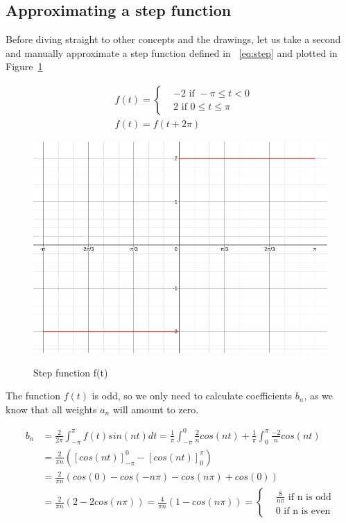 \documentclass[titlepage]{article}
\begin{document}
\subsection{Approximating a step function}
    
    Before diving straight to other concepts and the drawings, let us 
    take a second and manually approximate a step function defined in ~\eqref{eq:step}
    and plotted in Figure~\ref{fig:step_func}

    \begin{equation}\label{eq:step}
    \begin{split}
         &f(t) = 
        \begin{cases} 
            & -2 \text{ if } -\pi \leq t < 0 \\
            & 2 \text{ if }  0 \leq t \leq \pi
        \end{cases} \\
        & f(t) = f(t + 2\pi) 
    \end{split}
    \end{equation}

    \begin{figure}[H]
        \caption{Step function f(t)}
        \centering
        \includegraphics[width=0.5\linewidth]{step_func}
        \label{fig:step_func}
    \end{figure} 

    The function $f(t)$ is odd, so we only need to calculate coefficients $b_n$, as
    we know that all weights $a_n$ will amount to zero.

    \begin{equation}
    \begin{split}
        b_n & = \frac{2}{2\pi}\int_{-\pi}^{\pi}f(t)sin(nt)dt 
        = \frac{1}{\pi}\int_{-\pi}^{0}\frac{2}{n}cos(nt) + 
        \frac{1}{\pi}\int_{0}^{\pi}\frac{-2}{n}cos(nt) \\
        & = \frac{2}{\pi n}\left(\left[cos(nt) \right]_{-\pi}^{0}
        - \left[cos(nt) \right]_{0}^{\pi} \right) \\
        & = \frac{2}{\pi n}\left(cos(0) - cos(-n\pi) - cos(n\pi) + cos(0)\right) \\
        & = \frac{2}{\pi n}\left(2 - 2cos(n\pi)\right) 
        = \frac{4}{\pi n}\left(1 - cos(n\pi)\right) = 
        \begin{cases} 
            & \frac{8}{n\pi} \text{ if n is odd} \\
            & 0 \text{ if n is even}
        \end{cases} 
    \end{split}
    \end{equation}
    
\end{document}
